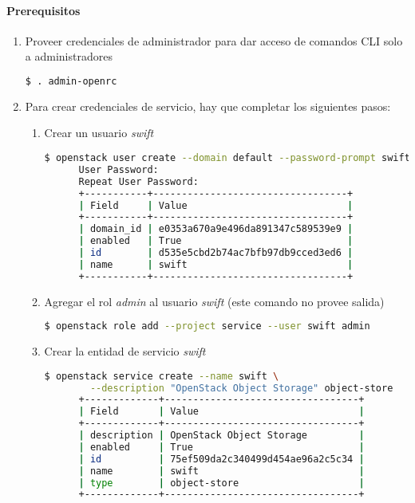 \documentclass{article}
\begin{document}
\paragraph{Prerequisitos}
\begin{enumerate}
  \item Proveer credenciales de administrador para dar acceso de comandos CLI solo a administradores
  \begin{lstlisting}[language=bash]
    $ . admin-openrc
  \end{lstlisting}
  
  \item Para crear credenciales de servicio, hay que completar los siguientes pasos:
  \begin{enumerate}
    \item Crear un usuario \emph{swift}
    \begin{lstlisting}[language=bash]
      $ openstack user create --domain default --password-prompt swift
      User Password:
      Repeat User Password:
      +-----------+----------------------------------+
      | Field     | Value                            |
      +-----------+----------------------------------+
      | domain_id | e0353a670a9e496da891347c589539e9 |
      | enabled   | True                             |
      | id        | d535e5cbd2b74ac7bfb97db9cced3ed6 |
      | name      | swift                            |
      +-----------+----------------------------------+
    \end{lstlisting}
    
    \item Agregar el rol \emph{admin} al usuario \emph{swift} (este comando no provee salida)
    \begin{lstlisting}[language=bash]
      $ openstack role add --project service --user swift admin
    \end{lstlisting}
    
    \item Crear la entidad de servicio \emph{swift}
    \begin{lstlisting}[language=bash]
      $ openstack service create --name swift \
        --description "OpenStack Object Storage" object-store
      +-------------+----------------------------------+
      | Field       | Value                            |
      +-------------+----------------------------------+
      | description | OpenStack Object Storage         |
      | enabled     | True                             |
      | id          | 75ef509da2c340499d454ae96a2c5c34 |
      | name        | swift                            |
      | type        | object-store                     |
      +-------------+----------------------------------+
    \end{lstlisting}
  \end{enumerate}


\end{enumerate}
\end{document}
